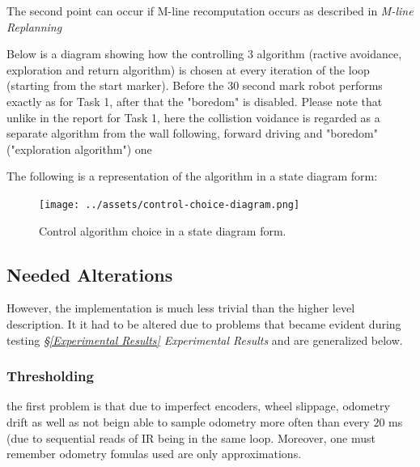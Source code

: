 \documentclass[11pt, a4paper]{article}
\begin{document}
The second point can occur if M-line recomputation occurs as described in \textit{M-line Replanning}

Below is a diagram showing how the controlling $3$ algorithm (ractive avoidance, exploration and return algorithm)
is chosen at every iteration of the loop (starting from the start marker). Before the 30 second mark robot
performs exactly as for Task 1, after that the "boredom"\cite{task1_report} is disabled. Please note
that unlike in the report for Task 1, here the collistion voidance is regarded as a separate algorithm from the
wall following, forward driving and "boredom" ("exploration algorithm") one

The following is a representation of the algorithm in a state diagram form:
\begin{figure}[h]
  \begin{center}
    \texttt{[image: ../assets/control-choice-diagram.png]}
    \caption{Control algorithm choice in a state diagram form.}
  \end{center}
\end{figure} 



\subsection{Needed Alterations}
\label{Needed Alterations}


However, the implementation is much less trivial than the higher level description. It it had 
to be altered due to problems that became evident during testing \textit{\S\ref{Experimental 
Results} Experimental Results} and are generalized below.

\subsubsection{Thresholding}



the first problem is that due to imperfect encoders, wheel slippage, odometry drift as well as not
beign able to sample odometry more often than every $20$ ms\cite{khepera_manual} (due to sequential 
reads of IR being in the same loop. Moreover, one must remember odometry fomulas used are only approximations.
\end{document}
